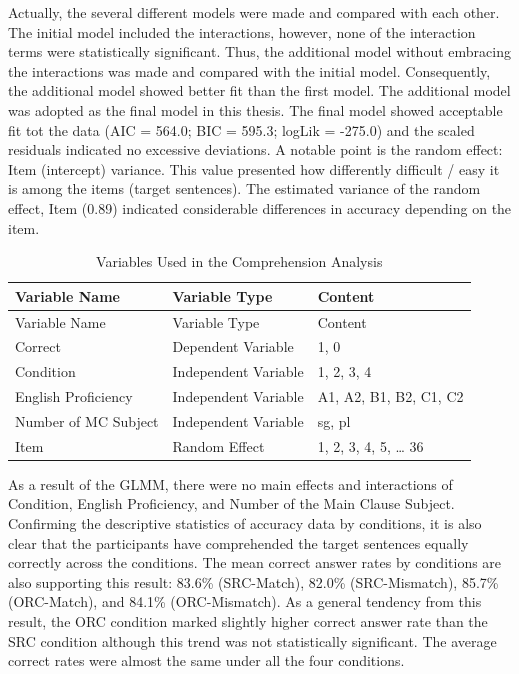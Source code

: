 \documentclass[
]{article}
\begin{document}
Actually, the several different models were made and compared with each
other. The initial model included the interactions, however, none of the
interaction terms were statistically significant. Thus, the additional
model without embracing the interactions was made and compared with the
initial model. Consequently, the additional model showed better fit than
the first model. The additional model was adopted as the final model in
this thesis. The final model showed acceptable fit tot the data (AIC =
564.0; BIC = 595.3; logLik = -275.0) and the scaled residuals indicated
no excessive deviations. A notable point is the random effect: Item
(intercept) variance. This value presented how differently difficult /
easy it is among the items (target sentences). The estimated variance of
the random effect, Item (0.89) indicated considerable differences in
accuracy depending on the item.

\begin{longtable}[]{@{}lll@{}}
\caption{Variables Used in the Comprehension Analysis}\tabularnewline
\toprule\noalign{}
Variable Name & Variable Type & Content \\
\midrule\noalign{}
\endfirsthead
\toprule\noalign{}
Variable Name & Variable Type & Content \\
\midrule\noalign{}
\endhead
\bottomrule\noalign{}
\endlastfoot
Correct & Dependent Variable & 1, 0 \\
Condition & Independent Variable & 1, 2, 3, 4 \\
English Proficiency & Independent Variable & A1, A2, B1, B2, C1, C2 \\
Number of MC Subject & Independent Variable & sg, pl \\
Item & Random Effect & 1, 2, 3, 4, 5, \ldots{} 36 \\
\end{longtable}

As a result of the GLMM, there were no main effects and interactions of
Condition, English Proficiency, and Number of the Main Clause
Subject.　Confirming the descriptive statistics of accuracy data by
conditions, it is also clear that the participants have comprehended the
target sentences equally correctly across the conditions. The mean
correct answer rates by conditions are also supporting this result:
83.6\% (SRC-Match), 82.0\% (SRC-Mismatch), 85.7\% (ORC-Match), and
84.1\% (ORC-Mismatch). As a general tendency from this result, the ORC
condition marked slightly higher correct answer rate than the SRC
condition although this trend was not statistically significant. The
average correct rates were almost the same under all the four
conditions.
\end{document}
